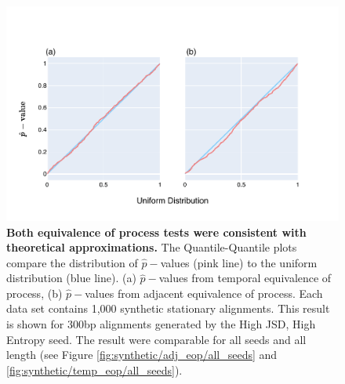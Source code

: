 \begin{figure}[htbp]
\centering
\includegraphics[width=\textwidth]{figures/plots/synthetic/adj-temp_eop/High JSD, High Entropy.pdf}
\caption{\textbf{Both equivalence of process tests were consistent with theoretical approximations.} The Quantile-Quantile plots compare the distribution of $\hat p-$values (pink line) to the uniform distribution (blue line). (a) $\hat p-$values from temporal equivalence of process, (b) $\hat p-$values from adjacent equivalence of process. Each data set contains 1,000 synthetic stationary alignments. This result is shown for 300bp alignments generated by the High JSD, High Entropy seed. The result were comparable for all seeds and all length (see Figure \ref{fig:synthetic/adj_eop/all_seeds} and \ref{fig:synthetic/temp_eop/all_seeds}).}
\label{fig:synthetic/adj-temp_eop/HighJSDHighEntropy}
\end{figure}